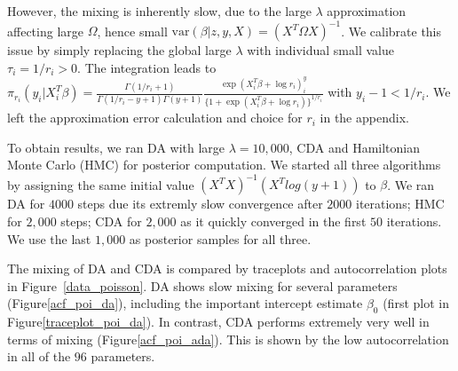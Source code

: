 \documentclass[10pt]{article}
\begin{document}
However, the mixing is inherently slow, due to the large $\lambda$ approximation affecting large $\Omega$, hence small $\mbox{var}(\beta|z,y,X)=(X^T \Omega X )^{-1}$. We calibrate this issue by simply replacing the global large $\lambda$ with individual small value $\tau_i=1/r_i>0$. The integration leads to $\pi_{r_i} (y_i| X_i^T \beta) =\frac{\Gamma(1/r_i+1)}{\Gamma(1/r_i-y+1)\Gamma(y+1)}\frac{\exp ( X_i^T\beta+\log r_i)^y_i}{\{1+ \exp ( X_i^T\beta+\log r_i)\}^{1/r_i}}$ with $y_i-1<1/r_i$. We left the approximation error calculation and choice for $r_i$ in the appendix.

To obtain results, we ran DA with large $\lambda=10,000$, CDA and Hamiltonian Monte Carlo (HMC) for posterior computation. We started all three algorithms by assigning the same initial value $(X^TX)^{-1}(X^T log( y+1))$ to ${\beta}$. We ran DA for $4000$ steps due its extremly slow convergence after $2000$ iterations; HMC for $2,000$ steps;  CDA for $2,000$ as it quickly converged in the first $50$ iterations. We use the last $1,000$ as posterior samples for all three. 

The mixing of DA and CDA is compared by traceplots and autocorrelation plots in Figure~\ref{data_poisson}. DA shows slow mixing for several parameters (Figure\ref{acf_poi_da}), including the important intercept estimate $\beta_0$ (first plot in Figure\ref{traceplot_poi_da}). In contrast, CDA performs extremely very well in terms of mixing (Figure\ref{acf_poi_ada}). This is shown by the low autocorrelation in all of the $96$ parameters. 
\end{document}
